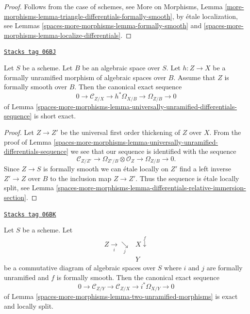 \begin{proof}
Follows from the case of schemes, see
More on Morphisms,
Lemma \ref{more-morphisms-lemma-triangle-differentials-formally-smooth},
by \'etale localization, see
Lemmas \ref{spaces-more-morphisms-lemma-formally-smooth} and \ref{spaces-more-morphisms-lemma-localize-differentials}.
\end{proof}

\begin{lemma}
\label{spaces-more-morphisms-lemma-differentials-formally-unramified-formally-smooth}
\href{https://stacks.math.columbia.edu/tag/06BJ}{\texttt{Stacks tag 06BJ}}

Let $S$ be a scheme. Let $B$ be an algebraic space over $S$.
Let $h : Z \to X$ be a formally unramified morphism of algebraic spaces
over $B$.
Assume that $Z$ is formally smooth over $B$. Then the
canonical exact sequence
$$
0 \to \mathcal{C}_{Z/X} \to h^*\Omega_{X/B} \to \Omega_{Z/B} \to 0
$$
of
Lemma \ref{spaces-more-morphisms-lemma-universally-unramified-differentials-sequence}
is short exact.
\end{lemma}

\begin{proof}
Let $Z \to Z'$ be the universal first order thickening of $Z$ over $X$.
From the proof of
Lemma \ref{spaces-more-morphisms-lemma-universally-unramified-differentials-sequence}
we see that our sequence is identified with the sequence
$$
\mathcal{C}_{Z/Z'} \to \Omega_{Z'/B} \otimes \mathcal{O}_Z \to
\Omega_{Z/B} \to 0.
$$
Since $Z \to S$ is formally smooth we can \'etale locally on $Z'$ find
a left inverse $Z' \to Z$ over $B$ to the inclusion map $Z \to Z'$.
Thus the sequence is \'etale locally split, see
Lemma \ref{spaces-more-morphisms-lemma-differentials-relative-immersion-section}.
\end{proof}

\begin{lemma}
\label{spaces-more-morphisms-lemma-two-unramified-morphisms-formally-smooth}
\href{https://stacks.math.columbia.edu/tag/06BK}{\texttt{Stacks tag 06BK}}

Let $S$ be a scheme. Let
$$
\begin{array}{cc}Z \underset{i}{\longrightarrow}\underset{j}{\searrow} & X \overset{f}{\downarrow} \\  & Y\end{array}
$$
be a commutative diagram of algebraic spaces over $S$
where $i$ and $j$ are formally unramified and $f$ is formally smooth.
Then the canonical exact sequence
$$
0 \to
\mathcal{C}_{Z/Y} \to
\mathcal{C}_{Z/X} \to
i^*\Omega_{X/Y} \to 0
$$
of
Lemma \ref{spaces-more-morphisms-lemma-two-unramified-morphisms}
is exact and locally split.
\end{lemma}

